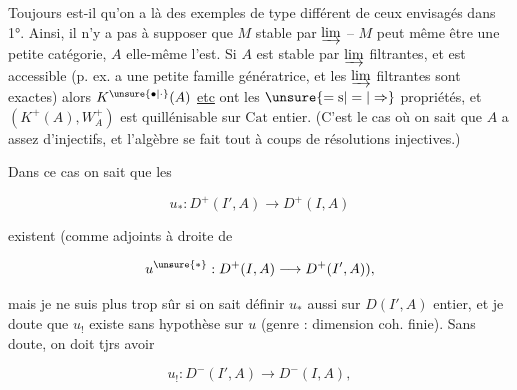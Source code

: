 
Toujours est-il qu'on a là des exemples de type  différent de ceux envisagés dans 1°. Ainsi, il n'y a pas à supposer que $M$  stable par  $\varinjlim$ -- $M$ peut même être une petite catégorie,   $A$ elle-même l'est. Si $A$ est stable par  $\varinjlim$ filtrantes, et est accessible (p. ex. a une petite famille génératrice, et les $\varinjlim$ filtrantes sont exactes) alors $K^{\unsure{\bullet|\cdot}}(A)$ \uline{etc} ont les $\unsure{=\mathrm{s}|=|\Rightarrow}$ propriétés, et $(K^+(A),W_A^+)$ est quillénisable sur $\mathrm{Cat}$  entier. (C'est le cas où on sait que $A$ a assez d'injectifs, et l'algèbre  se fait tout à coups de résolutions injectives.)



Dans ce cas on sait que les 

\[ u_*:D^+(I',A)\longrightarrow D^+(I,A) \]

existent (comme adjoints à droite de

\[ u^{\unsure{*}}:D^+(I,A)\longrightarrow D^+(I',A)), \]

mais je ne suis plus trop sûr si on sait définir $u_*$ aussi sur $D(I',A)$  entier, et je doute que $u_!$ existe sans hypothèse sur $u$ (genre : dimension coh. finie). Sans doute, on doit tjrs avoir

\[ u_!:D^-(I',A)\longrightarrow D^-(I,A), \]
